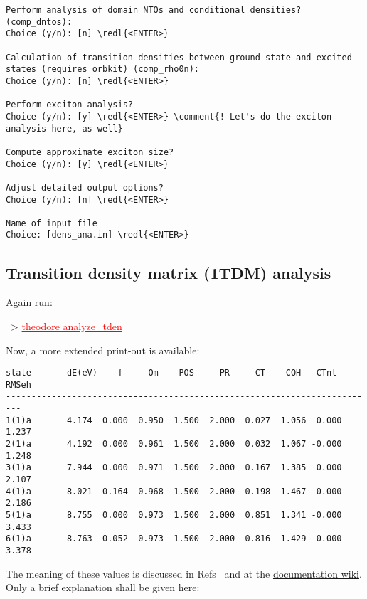 \documentclass[DIV=12,headings=normal]{scrartcl}
\newcommand{\comment}[1]{\textcolor{blue}{#1}}
\newcommand{\redl}[1]{{\textcolor{red}{\underline{#1}}}}
\newcommand{\comm}[1]{
\small
~> \redl{#1}
\normalsize
}
\begin{document}
\begin{Verbatim}[commandchars=\\\{\}]
Perform analysis of domain NTOs and conditional densities? (comp_dntos):
Choice (y/n): [n] \redl{<ENTER>}

Calculation of transition densities between ground state and excited states (requires orbkit) (comp_rho0n):
Choice (y/n): [n] \redl{<ENTER>}

Perform exciton analysis?
Choice (y/n): [y] \redl{<ENTER>} \comment{! Let's do the exciton analysis here, as well}

Compute approximate exciton size?
Choice (y/n): [y] \redl{<ENTER>}

Adjust detailed output options?
Choice (y/n): [n] \redl{<ENTER>}

Name of input file
Choice: [dens_ana.in] \redl{<ENTER>}
\end{Verbatim}
\normalsize
%
\subsection{Transition density matrix (1TDM) analysis}

Again run:

\comm{theodore analyze\_tden}

\clearpage
Now, a more extended print-out is available:

\scriptsize
\begin{Verbatim}[commandchars=\\\{\}]
state       dE(eV)    f     Om    POS     PR     CT    COH   CTnt  RMSeh
-------------------------------------------------------------------------
1(1)a       4.174  0.000  0.950  1.500  2.000  0.027  1.056  0.000  1.237
2(1)a       4.192  0.000  0.961  1.500  2.000  0.032  1.067 -0.000  1.248
3(1)a       7.944  0.000  0.971  1.500  2.000  0.167  1.385  0.000  2.107
4(1)a       8.021  0.164  0.968  1.500  2.000  0.198  1.467 -0.000  2.186
5(1)a       8.755  0.000  0.973  1.500  2.000  0.851  1.341 -0.000  3.433
6(1)a       8.763  0.052  0.973  1.500  2.000  0.816  1.429  0.000  3.378
\end{Verbatim}
\normalsize

The meaning of these values is discussed in Refs~\cite{DMAT, DMAT_ADC_II} and at the \href{https://sourceforge.net/p/theodore-qc/wiki/Transition density matrix analysis/}{documentation wiki}. Only a brief explanation shall be given here:
\end{document}
